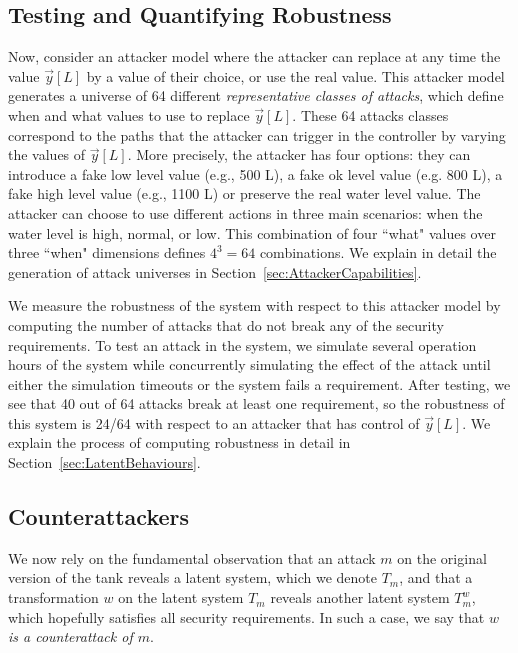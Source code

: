 \subsection*{Testing and Quantifying Robustness}
Now, consider an attacker model where the attacker can replace at any time the value $\vec{y}[L]$ by a value of their choice, or use the real value. This attacker model generates a universe of 64 different \emph{representative classes of attacks}, which define when and what values to use to replace $\vec{y}[L]$. These 64 attacks classes correspond to the paths that the attacker can trigger in the controller by varying the values of $\vec{y}[L]$.  More precisely, the attacker has four options: they can introduce a fake low level value (e.g., 500 L), a fake ok level value (e.g. 800 L), a fake high level value (e.g., 1100 L) or preserve the real water level value. The attacker can choose to use different actions in three main scenarios: when the water level is high, normal, or low. This combination of four ``what" values over three ``when" dimensions defines $4^3=64$ combinations. We explain in detail the generation of attack universes in Section~\ref{sec:AttackerCapabilities}. 

We measure the robustness of the system with respect to this attacker model by computing the number of attacks that do not break any of the security requirements. To test an attack in the system, we simulate several operation hours of the system while concurrently simulating the effect of the attack until either the simulation timeouts or the system fails a requirement. After testing, we see that 40 out of 64 attacks break at least one requirement, so the robustness of this system is 24/64 with respect to an attacker that has control of $\vec{y}[L]$. We explain the process of computing robustness in detail in Section~\ref{sec:LatentBehaviours}.

\subsection*{Counterattackers}
We now rely on the fundamental observation that an attack $m$ on the original version of the tank reveals a latent system, which we denote $T_m$, and that a transformation $w$ on the latent system $T_m$ reveals another latent system $T^w_m$, which hopefully satisfies all security requirements. In such a case, we say that \emph{$w$ is a counterattack of $m$}. 

